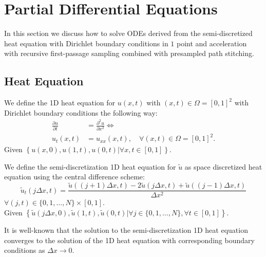 \documentclass[a4paper,12pt]{article}
\begin{document}
\newpage
\mbox{}

\newpage

\section{Partial Differential Equations}

In this section we discuss how to solve ODEs derived from the semi-discretized heat equation
with Dirichlet boundary conditions in $1$ point and acceleration with recursive first-passage sampling
combined with presampled path stitching.

\subsection{Heat Equation}
\begin{definition} \label{def:heat equation square}
  We define the 1D heat equation for $u(x,t)$ with $ (x,t) \in \Omega = [0,1]^2$
  with Dirichlet boundary conditions the following way:
  \begin{align}
    \frac{\partial u}{\partial t} & = \frac{\partial^{2} u}{\partial x^{2}}  \Leftrightarrow   \\
    u_t(x,t)                      & = u_{xx}(x,t), \quad \forall (x,t) \in \Omega = [0,1]^2  .
  \end{align}
  Given $\left\{u(x,0),u(1,t),u(0,t) | \forall x,t \in [0,1]  \right\} $.
\end{definition}

\begin{definition} \label{def:discrete heat equation square}
  We define the semi-discretization 1D heat equation for $\tilde{u}$ as space discretized heat equation
  using the central difference scheme:
  \begin{equation}
    \tilde{u}_t(j \Delta x,t)  = \frac{\tilde{u}((j+1) \Delta x, t)-2\tilde{u}(j \Delta x, t)+\tilde{u}((j-1) \Delta x, t)}{\Delta x^{2}}
  \end{equation}
  $\forall (j,t) \in \{0, 1, \ldots, N\} \times [0,1]$. \\
  Given $\left\{\tilde{u}(j \Delta x,0),\tilde{u}(1,t),\tilde{u}(0,t) | \forall j \in \{0, 1, \ldots, N\}, \forall t \in  [0,1]  \right\} $.

  It is well-known that the solution to the semi-discretization 1D heat equation converges to the solution of the 1D heat equation with
  corresponding boundary conditions as $\Delta x \rightarrow 0$.
\end{definition}
\end{document}
